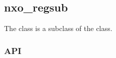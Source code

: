 %
%
%
%
%

\subsection{nxo\_regsub}
\label{nxo_regsub}

The  class is a subclass of the  class.

\subsubsection{API}
